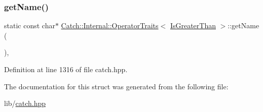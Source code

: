 \subsubsection{\texorpdfstring{get\+Name()}{getName()}}
{\footnotesize\ttfamily static const char$\ast$ \hyperlink{struct_catch_1_1_internal_1_1_operator_traits}{Catch\+::\+Internal\+::\+Operator\+Traits}$<$ \hyperlink{namespace_catch_1_1_internal_ae3f96598a7858155750bf38e7295d83eac0e8866139e99803d169595af70f6c22}{Is\+Greater\+Than} $>$\+::get\+Name (\begin{DoxyParamCaption}{ }\end{DoxyParamCaption})\hspace{0.3cm}{\ttfamily [inline]}, {\ttfamily [static]}}



Definition at line 1316 of file catch.\+hpp.



The documentation for this struct was generated from the following file\+:\begin{DoxyCompactItemize}
\item 
lib/\hyperlink{catch_8hpp}{catch.\+hpp}\end{DoxyCompactItemize}
